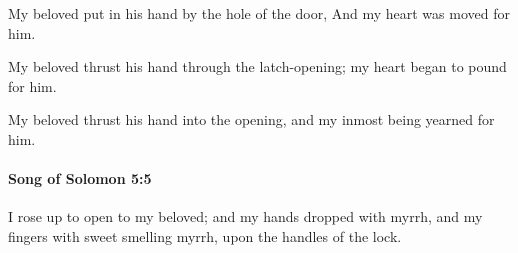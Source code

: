 			\begin{versebox}
					\item[BHS] 
					\item[LXX] 
					\item[ASV] My beloved put in his hand by the hole of the door, And my heart was moved for him.
					\item[NIV] My beloved thrust his hand through the latch-opening; my heart began to pound for him.
					\item[NRSV] My beloved thrust his hand into the opening, and my inmost being yearned for him.
			\end{versebox}

		\paragraph{Song of Solomon 5:5} %
			\label{SONGOFSOLOMON-5-5}

			I rose up to open to my beloved; and my hands dropped with myrrh, and my fingers with sweet smelling myrrh, upon the handles of the lock.

